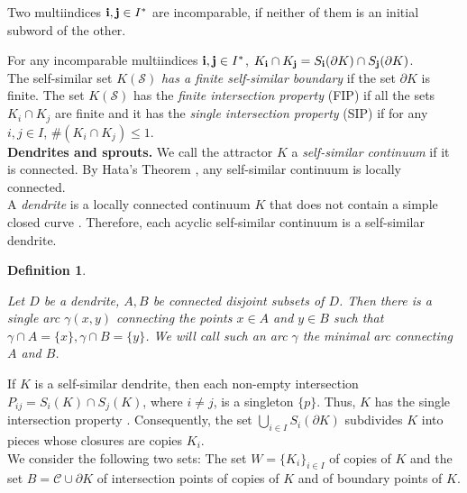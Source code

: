 \documentclass[11pt,reqno]{amsart}
\newtheorem{definition}[theorem]{Definition}
\newcommand{\eS}{{\mathcal S}}
\begin{document}
Two multiindices  ${\bf {i}},{\bf {j}}\in I^*$ are incomparable, if neither of them is an initial subword of the other.

For any incomparable multiindices ${\bf {i}},{\bf {j}}\in I^*$, $K_{\bf {i}}\cap K_{\bf {j}}=S_{\bf {i}}({\partial} K)\cap S_{\bf {j}}({\partial} K)$. \\
The self-similar set $K({\eS})$ {\em has a finite self-similar boundary} if the set ${\partial} K$ is finite. 
The set $K({\eS})$ has the {\em finite intersection property} (FIP) if all the sets $K_i\cap K_j$ are finite and it has the {\em single intersection property}   (SIP) if for any $i,j\in I$, $\#(K_i\cap K_j)\le 1$.\\


{\bf Dendrites and sprouts.} We call the attractor $K$  a {\em self-similar continuum} if it is connected. 
By Hata's Theorem \cite{Hata85}, any self-similar continuum is locally connected.\\
A {\em  dendrite}  is a locally connected continuum $K$ that does not contain a simple closed curve \cite{Kur}. 
Therefore, each acyclic self-similar continuum is a self-similar dendrite.\\

  \begin{definition}\label{minarc}
      
Let $D$ be a dendrite, $A, B$ be connected disjoint subsets of $D$. Then there is a single arc $\gamma(x,y)$ connecting the points $x\in A$ and $y\in B$ such that $\gamma \cap A =\{x\}, \gamma\cap B=\{y\}$. We will call such an arc $\gamma$ the minimal arc connecting $A$ and $B$.
\end{definition}
 




If $K$ is a   self-similar dendrite, then  each non-empty intersection   $P_{ij} =S_i(K)\cap S_j(K)$, where $ i \neq j$, is a singleton $\{p\}$. 
Thus,  $K$ has the single intersection property \cite{TYK}. 
Consequently, the set $\bigcup\limits_{i\in I} S_i(\partial K)$ subdivides $K$ into  pieces whose closures are  copies $K_i$.\\




We consider the following two sets: 
 The set $W = \{K_i\}_{i \in I}$ of copies of $K$ and   the set $B = {\mathcal C} \cup \partial K$ of intersection points of copies of $K$ and of boundary points of $K$.\\
\end{document}
